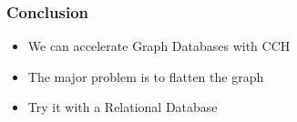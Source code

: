 \begin{frame}
    \frametitle{Conclusion}
    
    \begin{itemize}
        \item We can accelerate Graph Databases with CCH
        \item The major problem is to flatten the graph
        \item Try it with a Relational Database
    \end{itemize}

\end{frame}